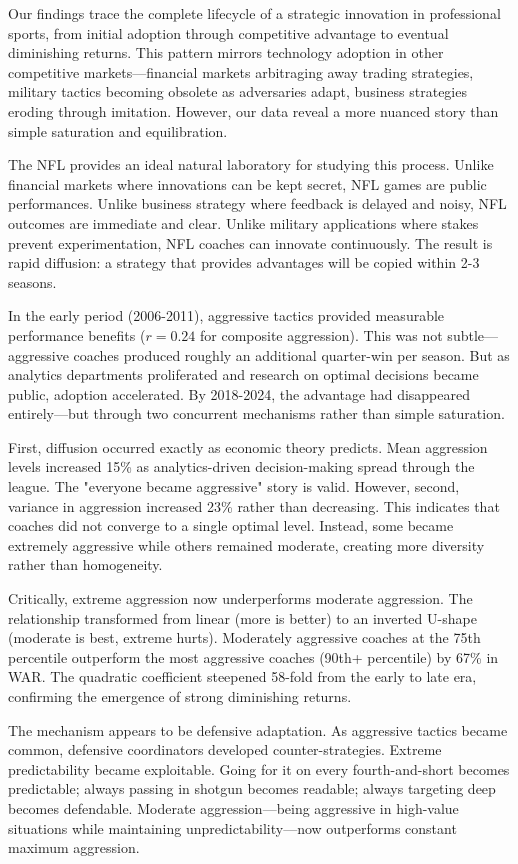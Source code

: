 \documentclass[11pt,twocolumn]{article}
\begin{document}
Our findings trace the complete lifecycle of a strategic innovation in professional sports, from initial adoption through competitive advantage to eventual diminishing returns. This pattern mirrors technology adoption in other competitive markets---financial markets arbitraging away trading strategies, military tactics becoming obsolete as adversaries adapt, business strategies eroding through imitation. However, our data reveal a more nuanced story than simple saturation and equilibration.

The NFL provides an ideal natural laboratory for studying this process. Unlike financial markets where innovations can be kept secret, NFL games are public performances. Unlike business strategy where feedback is delayed and noisy, NFL outcomes are immediate and clear. Unlike military applications where stakes prevent experimentation, NFL coaches can innovate continuously. The result is rapid diffusion: a strategy that provides advantages will be copied within 2-3 seasons.

In the early period (2006-2011), aggressive tactics provided measurable performance benefits ($r=0.24$ for composite aggression). This was not subtle---aggressive coaches produced roughly an additional quarter-win per season. But as analytics departments proliferated and research on optimal decisions became public, adoption accelerated. By 2018-2024, the advantage had disappeared entirely---but through two concurrent mechanisms rather than simple saturation.

First, diffusion occurred exactly as economic theory predicts. Mean aggression levels increased 15\% as analytics-driven decision-making spread through the league. The "everyone became aggressive" story is valid. However, second, variance in aggression increased 23\% rather than decreasing. This indicates that coaches did not converge to a single optimal level. Instead, some became extremely aggressive while others remained moderate, creating more diversity rather than homogeneity.

Critically, extreme aggression now underperforms moderate aggression. The relationship transformed from linear (more is better) to an inverted U-shape (moderate is best, extreme hurts). Moderately aggressive coaches at the 75th percentile outperform the most aggressive coaches (90th+ percentile) by 67\% in WAR. The quadratic coefficient steepened 58-fold from the early to late era, confirming the emergence of strong diminishing returns.

The mechanism appears to be defensive adaptation. As aggressive tactics became common, defensive coordinators developed counter-strategies. Extreme predictability became exploitable. Going for it on every fourth-and-short becomes predictable; always passing in shotgun becomes readable; always targeting deep becomes defendable. Moderate aggression---being aggressive in high-value situations while maintaining unpredictability---now outperforms constant maximum aggression.
\end{document}
